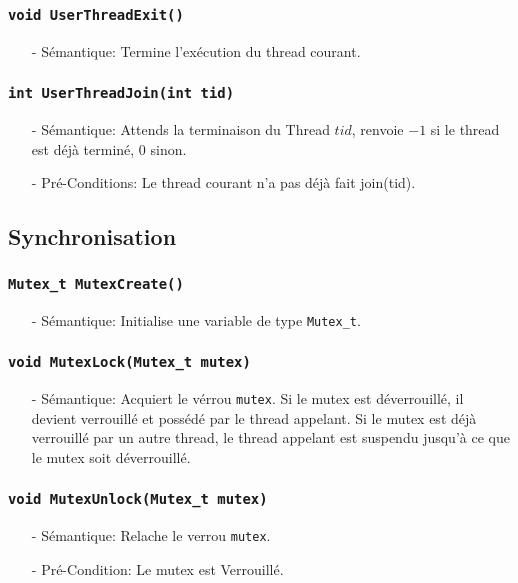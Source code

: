 \documentclass[11pt]{article}
\begin{document}
\subsubsection{\texttt{void UserThreadExit()}}
\begin{itemize}
\item[-] Sémantique: Termine l'exécution du thread courant.
\end{itemize}

\subsubsection{\texttt{int UserThreadJoin(int tid)}}
\begin{itemize}
\item[-] Sémantique: Attends la terminaison du Thread $tid$, renvoie $-1$
  si le thread est déjà terminé, $0$ sinon.
\item[-] Pré-Conditions: Le thread courant n'a pas déjà fait join(tid). 
\end{itemize}

\subsection{Synchronisation}
\subsubsection{\texttt{Mutex\_t MutexCreate()}}
\begin{itemize}
\item[-]Sémantique: Initialise une variable de type \texttt{Mutex\_t}.
\end{itemize}

\subsubsection{\texttt{void MutexLock(Mutex\_t mutex)}}
\begin{itemize}
\item[-]Sémantique: Acquiert le vérrou \texttt{mutex}. Si le mutex est déverrouillé, il devient verrouillé
  et possédé par le thread appelant. Si le mutex est déjà verrouillé par un autre thread,
  le thread appelant est suspendu jusqu'à ce que le mutex soit déverrouillé.
\end{itemize}

\subsubsection{\texttt{void MutexUnlock(Mutex\_t mutex)}}
\begin{itemize}
\item[-]Sémantique: Relache le verrou \texttt{mutex}.
\item[-]Pré-Condition: Le mutex est Verrouillé.
\end{itemize}
\end{document}
